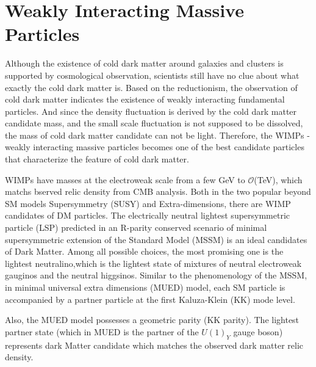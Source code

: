 \section{Weakly Interacting Massive Particles}
\par Although the existence of cold dark matter around galaxies and clusters is supported by cosmological observation, scientists still have no clue about what exactly the cold dark matter is. Based on the reductionism, the observation of cold dark matter indicates the existence of weakly interacting fundamental particles. And since the density fluctuation is derived by the cold dark matter candidate mass, and the small scale fluctuation is not supposed to be dissolved, the mass of cold dark matter candidate can not be light. Therefore, the WIMPs - weakly interacting massive particles becomes one of the best candidate particles that characterize the feature of cold dark matter.

\par WIMPs have masses at the electroweak scale from a few GeV to $\mathcal{O}$(TeV), which matchs bserved relic density from CMB analysis.  Both in the two popular beyond SM models Supersymmetry (SUSY) and Extra-dimensions, there are WIMP candidates of DM particles. The electrically neutral lightest supersymmetric particle (LSP) predicted in an R-parity conserved scenario of minimal supersymmetric extension of the Standard Model (MSSM) is an ideal candidates of Dark Matter.  Among all possible choices, the most promising one is the lightest neutralino,which is the lightest state of mixtures of neutral electroweak gauginos and the neutral higgsinos\cite{Feng:2010gw}. Similar to the phenomenology of the MSSM, in minimal universal extra dimensions (MUED) model, each SM particle is accompanied by a partner particle at the first Kaluza-Klein (KK) mode level.

\par Also, the MUED model possesses a geometric parity (KK parity). The lightest partner state (which in MUED is the partner of the $U(1)_Y$ gauge boson) represents dark Matter candidate which matches the observed dark matter relic density\cite{Servant:2002aq}.

